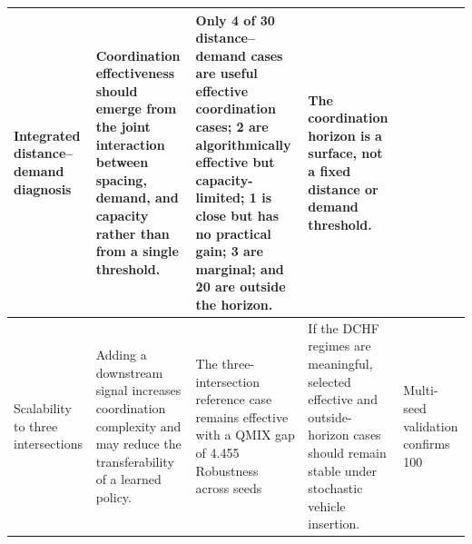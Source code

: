 \begin{table}[H]
\begin{tabular}{p{}p{}p{}p{}}
\midrule
Integrated distance--demand diagnosis & Coordination effectiveness should emerge from the joint interaction between spacing, demand, and capacity rather than from a single threshold. & Only 4 of 30 distance--demand cases are useful effective coordination cases; 2 are algorithmically effective but capacity-limited; 1 is close but has no practical gain; 3 are marginal; and 20 are outside the horizon. & The coordination horizon is a surface, not a fixed distance or demand threshold. \\
\midrule
Scalability to three intersections & Adding a downstream signal increases coordination complexity and may reduce the transferability of a learned policy. & The three-intersection reference case remains effective with a QMIX gap of 4.455%
\midrule
Robustness across seeds & If the DCHF regimes are meaningful, selected effective and outside-horizon cases should remain stable under stochastic vehicle insertion. & Multi-seed validation confirms 100%
\midrule
\bottomrule
\end{tabular}
\end{table}
